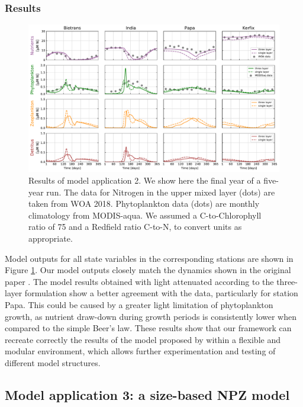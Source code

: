 \documentclass[journal abbreviation, manuscript]{copernicus}
\begin{document}
\subsubsection{Results}
\begin{figure}[t]
\includegraphics[width=15cm]{Figures/firstdraft_plots/02_EMPOWER_lightcomp.pdf}
\caption{Results of model application 2. We show here the final year of a five-year run. The data for Nitrogen in the upper mixed layer (dots) are taken from WOA 2018. Phytoplankton data (dots) are monthly climatology from MODIS-aqua. We assumed a C-to-Chlorophyll ratio of 75 and a Redfield ratio C-to-N, to convert units as appropriate.}
\label{Figure:ResultsEMPOWER}
\end{figure}

Model outputs for all state variables in the corresponding stations are shown in Figure \ref{Figure:ResultsEMPOWER}. Our model outputs closely match the dynamics shown in the original paper \citep{Anderson2015c}. The model results obtained with light attenuated according to the three-layer formulation show a better agreement with the data, particularly for station Papa. This could be caused by a greater light limitation of phytoplankton growth, as nutrient draw-down during growth periods is consistently lower when compared to the simple Beer's law. These results show that our framework can recreate correctly the results of the model proposed by \citet{Anderson2015c} within a flexible and modular environment, which allows further experimentation and testing of different model structures.


\subsection{Model application 3: a size-based NPZ model}
\end{document}
